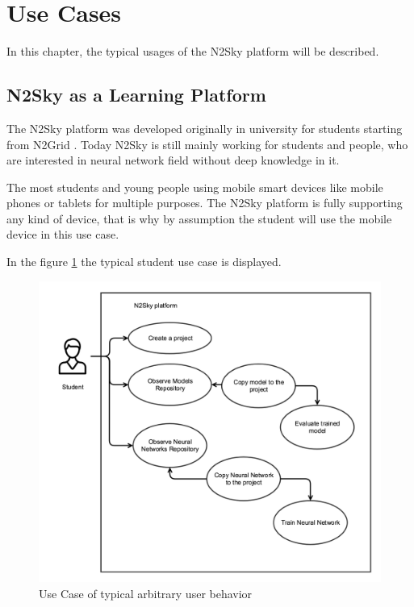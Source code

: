 \section{Use Cases}\label{Use Cases}

In this chapter, the typical usages of the N2Sky platform will be described.

\subsection{N2Sky as a Learning Platform}\label{N2Sky as a learning platform}

The N2Sky platform was developed originally in university for students starting from N2Grid \cite{schikuta2004n2grid}. Today N2Sky is still mainly working for students and people, who are interested in neural network field without deep knowledge in it. 

The most students and young people using mobile smart devices like mobile phones or tablets for multiple purposes. The N2Sky platform is fully supporting any kind of device, that is why by assumption the student will use the mobile device in this use case. 

In the figure \ref{fig:use_case_student} the typical student use case is displayed.


\begin{figure}[htbp]
\begin{center}
  \includegraphics[width=\linewidth]{components/usecase/img/use_case_student.png}
  \caption{Use Case of typical arbitrary user behavior}
  \label{fig:use_case_student}
\end{center}
\end{figure} 

